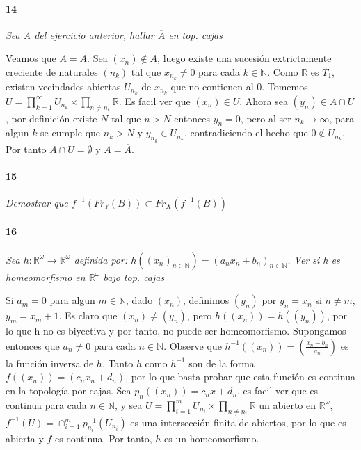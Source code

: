 \documentclass[12pt]{article}
\begin{document}
\paragraph{14}
\textit{Sea A del ejercicio anterior, hallar $\overline{A}$ en top. cajas}

Veamos que $A=\overline{A}$. Sea $(x_n) \notin A$, luego existe una sucesión extrictamente creciente de naturales $(n_k)$ tal que $x_{n_k} \neq 0$ para cada $k \in \mathbb{N}$. Como $\mathbb{R}$ es $T_1$, existen vecindades abiertas $U_{n_k}$ de $x_{n_k}$ que no contienen al $0$.
Tomemos $U=\prod_{k=1}^{\infty}U_{n_k} \times \prod_{n \neq n_k} \mathbb{R}$. Es facil ver que $(x_n) \in U$. Ahora sea $(y_n) \in A \cap U$, por definición existe $N$ tal que $n>N$ entonces $y_n=0$, pero al ser $n_k \to \infty$, para algun $k$ se cumple que
$n_k>N$ y $y_{n_k} \in U_{n_k}$, contradiciendo el hecho que $0 \notin U_{n_k}$. Por tanto $A \cap U = \emptyset$ y $A=\overline{A}$.
\paragraph{15}
\textit{Demostrar que $f^{-1}(Fr_Y(B))\subset Fr_X(f^{-1}(B))$}

\paragraph{16}
\textit{Sea $h:\mathbb{R}^\omega\rightarrow\mathbb{R}^\omega$ definida por: $h((x_n)_{n\in\mathbb{N}})=(a_n x_n +b_n)_{n\in\mathbb{N}}$. Ver si h es homeomorfismo en $\mathbb{R}^\omega$ bajo top. cajas}

Si $a_m=0$ para algun $m \in \mathbb{N}$, dado $(x_n)$, definimos $(y_n)$ por $y_n=x_n$ si $n \neq m$, $y_m=x_m+1$. Es claro que $(x_n) \neq (y_n)$, pero $h((x_n))=h((y_n))$, por lo que h no es biyectiva y por tanto, no puede ser homeomorfismo.
Supongamos entonces que $a_n \neq 0$ para cada $n \in \mathbb{N}$. Observe que $h^{-1}((x_n))=(\frac{x_n-b_n}{a_n})$ es la función inversa de $h$. Tanto $h$ como $h^{-1}$ son de la forma $f((x_n))=(c_n x_n+d_n)$, por lo que basta probar que esta función
es continua en la topología por cajas. Sea $p_n((x_n))=c_nx+d_n$, es facil ver que es continua para cada $n \in \mathbb{N}$, y sea $U=\prod_{i=1}^{m} U_{n_i} \times \prod_{n\neq n_i} \mathbb{R}$ un abierto en $\mathbb{R}^\omega$,  $f^{-1}(U)=\cap_{i=1}^{m} p^{-1}_{n_i}(U_{n_i})$ es una
intersección finita de abiertos, por lo que es abierta y $f$ es continua. Por tanto, $h$ es un homeomorfismo.
\end{document}
